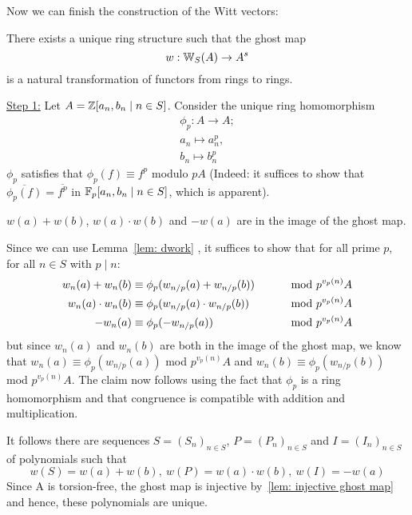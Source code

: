Now we can finish the construction of the Witt vectors:
\begin{theorem} \label{thm: existence of Witt vectors}
    There exists a unique ring structure such that the ghost map 
    \[
      w:\mathbb{W}_S(A) \to A^s  
    \]
    is a natural transformation of functors from rings to rings.
\end{theorem}
\begin{bigproof}
    \underline{Step 1:} Let $A=\mathbb{Z} [a_n,b_n \mid n \in S]$. Consider the unique
    ring homomorphism 
    \begin{align*}
        \phi_p \colon A \to A; \\
        a_n \mapsto a_n^p, \\
        b_n \mapsto b_n^p
    \end{align*}
    $\phi_p$ satisfies that $\phi_p(f) \equiv f^p$ modulo $pA$ (Indeed: it suffices to show that $\overline{\phi_p(f)}
    = \overline{f^p}$ in $\mathbb{F}_p[a_n,b_n \mid n \in S]$, which is apparent). \todo{}
    \begin{claim*}
        $w(a)+w(b)$, $w(a) \cdot w(b)$ and $-w(a)$ are in the image of the ghost map.
    \end{claim*}
    \begin{smallproof}
        Since we can use Lemma~\ref{lem: dwork} , it suffices to show that
        for all prime $p$, for all $n \in S$ with $p \mid n$:
        \begin{align*}
           w_n(a)+w_n(b) &\equiv \phi_p(w_{n/p}(a)+w_{n/p}(b)) &\text{\hskip8mm mod } p^{v_p(n)}A \\
           w_n(a)\cdot w_n(b) &\equiv \phi_p(w_{n/p}(a) \cdot w_{n/p}(b)) &\text{\hskip8mm mod } p^{v_p(n)}A \\
           -w_n(a) &\equiv \phi_p(-w_{n/p}(a)) &\text{\hskip8mm mod } p^{v_p(n)}A
        \end{align*} 
        but since $w_n(a)$ and $w_n(b)$ are both in the image of the ghost map, we know that
        $w_n(a) \equiv \phi_p(w_{n/p}(a))$ mod $p^{v_p(n)}A$ and 
        $w_n(b) \equiv \phi_p(w_{n/p}(b))$ mod $p^{v_p(n)}A$.
        The claim now follows using the fact that $\phi_p$ is a ring homomorphism and 
        that congruence is compatible with addition and multiplication.
        \end{smallproof}
    It follows there are sequences $S = (S_n)_{n \in S}$, $P = (P_n)_{n \in S}$
    and $I = (I_n)_{n \in S}$ of polynomials such that
    \[
        w(S) = w(a) + w(b), \ w(P) = w(a) \cdot w(b), \ w(I) = -w(a)
    \]
    Since A is torsion-free, the ghost map is injective by~\ref{lem: injective ghost map}
    and hence, these polynomials are unique.


\end{bigproof}
